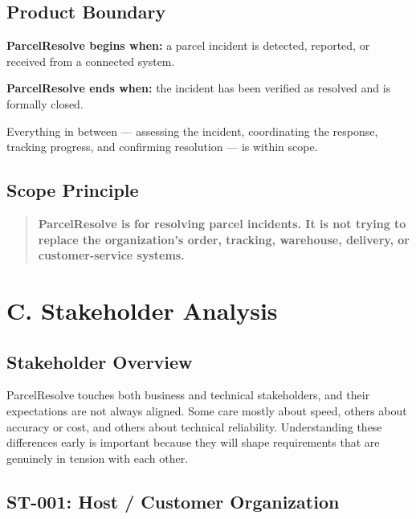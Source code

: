\documentclass[11pt,a4paper]{article}
\begin{document}

\subsection{Product Boundary}

\textbf{ParcelResolve begins when:} a parcel incident is detected,
reported, or received from a connected system.

\textbf{ParcelResolve ends when:} the incident has been verified as
resolved and is formally closed.

Everything in between --- assessing the incident, coordinating the
response, tracking progress, and confirming resolution --- is within
scope.


\subsection{Scope Principle}

\begin{quote}
\textbf{ParcelResolve is for resolving parcel incidents. It is not
trying to replace the organization's order, tracking, warehouse,
delivery, or customer-service systems.}
\end{quote}



\section{C. Stakeholder Analysis}

\subsection{Stakeholder Overview}

ParcelResolve touches both business and technical stakeholders, and
their expectations are not always aligned. Some care mostly about
speed, others about accuracy or cost, and others about technical
reliability. Understanding these differences early is important
because they will shape requirements that are genuinely in tension
with each other.


\subsection{ST-001: Host / Customer Organization}
\end{document}
